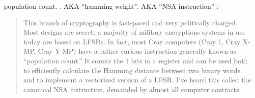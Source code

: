   \item[POPCNT] population count. 
  .
  \ac{AKA} ``hamming weight''.
  \ac{AKA} ``NSA instruction'' :

\begin{framed}
\begin{quotation}
  This branch of cryptography is fast-paced and very politically charged.
  Most designs are secret; a majority of military encryptions systems in use today are 
  based on LFSRs. 
  In fact, most Cray computers (Cray 1, Cray X-MP, Cray Y-MP) have a rather curious 
  instruction generally known as “population count.” It counts the 1 bits in a register 
  and can be used both to efficiently calculate the Hamming distance between two binary 
  words and to implement a vectorized version of a LFSR. I’ve heard this called the canonical 
  NSA instruction, demanded by almost all computer contracts.
\end{quotation}
\end{framed}
\cite{Schneier}

